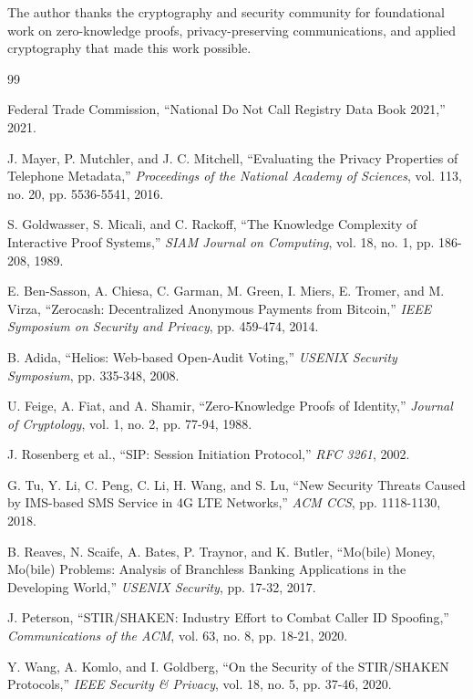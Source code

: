 \documentclass[11pt,twocolumn]{article}
\begin{document}
The author thanks the cryptography and security community for foundational work on zero-knowledge proofs, privacy-preserving communications, and applied cryptography that made this work possible.

\begin{thebibliography}{99}

Federal Trade Commission, ``National Do Not Call Registry Data Book 2021,'' 2021.

J. Mayer, P. Mutchler, and J. C. Mitchell, ``Evaluating the Privacy Properties of Telephone Metadata,'' \textit{Proceedings of the National Academy of Sciences}, vol. 113, no. 20, pp. 5536-5541, 2016.

S. Goldwasser, S. Micali, and C. Rackoff, ``The Knowledge Complexity of Interactive Proof Systems,'' \textit{SIAM Journal on Computing}, vol. 18, no. 1, pp. 186-208, 1989.

E. Ben-Sasson, A. Chiesa, C. Garman, M. Green, I. Miers, E. Tromer, and M. Virza, ``Zerocash: Decentralized Anonymous Payments from Bitcoin,'' \textit{IEEE Symposium on Security and Privacy}, pp. 459-474, 2014.

B. Adida, ``Helios: Web-based Open-Audit Voting,'' \textit{USENIX Security Symposium}, pp. 335-348, 2008.

U. Feige, A. Fiat, and A. Shamir, ``Zero-Knowledge Proofs of Identity,'' \textit{Journal of Cryptology}, vol. 1, no. 2, pp. 77-94, 1988.

J. Rosenberg et al., ``SIP: Session Initiation Protocol,'' \textit{RFC 3261}, 2002.

G. Tu, Y. Li, C. Peng, C. Li, H. Wang, and S. Lu, ``New Security Threats Caused by IMS-based SMS Service in 4G LTE Networks,'' \textit{ACM CCS}, pp. 1118-1130, 2018.

B. Reaves, N. Scaife, A. Bates, P. Traynor, and K. Butler, ``Mo(bile) Money, Mo(bile) Problems: Analysis of Branchless Banking Applications in the Developing World,'' \textit{USENIX Security}, pp. 17-32, 2017.

J. Peterson, ``STIR/SHAKEN: Industry Effort to Combat Caller ID Spoofing,'' \textit{Communications of the ACM}, vol. 63, no. 8, pp. 18-21, 2020.

Y. Wang, A. Komlo, and I. Goldberg, ``On the Security of the STIR/SHAKEN Protocols,'' \textit{IEEE Security \& Privacy}, vol. 18, no. 5, pp. 37-46, 2020.


\end{thebibliography}
\end{document}

